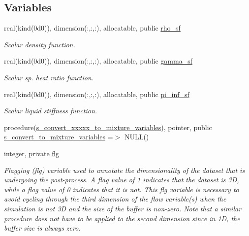 \subsection*{Variables}
\begin{DoxyCompactItemize}
\item 
real(kind(0d0)), dimension(\+:,\+:,\+:), allocatable, public \hyperlink{namespacem__variables__conversion_a8c8453ac97029955f5a3d1247c37059d}{rho\+\_\+sf}
\begin{DoxyCompactList}\small\item\em Scalar density function. \end{DoxyCompactList}\item 
real(kind(0d0)), dimension(\+:,\+:,\+:), allocatable, public \hyperlink{namespacem__variables__conversion_a3a21cf2a54ae67e6a2e22f6cffb97c75}{gamma\+\_\+sf}
\begin{DoxyCompactList}\small\item\em Scalar sp. heat ratio function. \end{DoxyCompactList}\item 
real(kind(0d0)), dimension(\+:,\+:,\+:), allocatable, public \hyperlink{namespacem__variables__conversion_a364012a38a5ba3bcb14bbb6084206fae}{pi\+\_\+inf\+\_\+sf}
\begin{DoxyCompactList}\small\item\em Scalar liquid stiffness function. \end{DoxyCompactList}\item 
procedure(\hyperlink{interfacem__variables__conversion_1_1s__convert__xxxxx__to__mixture__variables}{s\+\_\+convert\+\_\+xxxxx\+\_\+to\+\_\+mixture\+\_\+variables}), pointer, public \hyperlink{namespacem__variables__conversion_a13c16c62aae8663c39c82c23cff0e84a}{s\+\_\+convert\+\_\+to\+\_\+mixture\+\_\+variables} =$>$ N\+U\+LL()
\item 
integer, private \hyperlink{namespacem__variables__conversion_adcf907c5965b8d933e502c0a7878709b}{flg}
\begin{DoxyCompactList}\small\item\em Flagging (flg) variable used to annotate the dimensionality of the dataset that is undergoing the post-\/process. A flag value of 1 indicates that the dataset is 3D, while a flag value of 0 indicates that it is not. This flg variable is necessary to avoid cycling through the third dimension of the flow variable(s) when the simulation is not 3D and the size of the buffer is non-\/zero. Note that a similar procedure does not have to be applied to the second dimension since in 1D, the buffer size is always zero. \end{DoxyCompactList}\end{DoxyCompactItemize}



